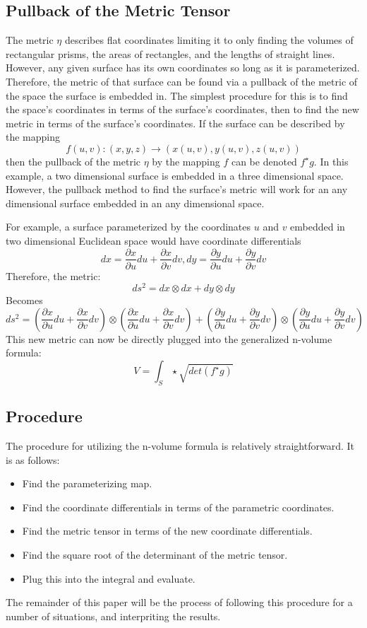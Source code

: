\documentclass{article}
\begin{document}
\subsection{Pullback of the Metric Tensor}
The metric $\eta$ describes flat coordinates limiting it to only finding the volumes of rectangular prisms, the areas of rectangles, and the lengths of straight lines. However, any given surface has its own coordinates so long as it is parameterized. Therefore, the metric of that surface can be found via a pullback of the metric of the space the surface is embedded in. The simplest procedure for this is to find the space's coordinates in terms of the surface's coordinates, then to find the new metric in terms of the surface's coordinates. If the surface can be described by the mapping
\[
f(u,v): (x,y,z) \rightarrow (x(u,v), y(u,v), z(u,v))
\]
then the pullback of the metric $\eta$ by the mapping $f$ can be denoted $f^{\star}g$. In this example, a two dimensional surface is embedded in a three dimensional space. However, the pullback method to find the surface's metric will work for an any dimensional surface embedded in an any dimensional space.

For example, a surface parameterized by the coordinates $u$ and $v$ embedded in two dimensional Euclidean space would have coordinate differentials
\[
dx = \frac{\partial x}{\partial u}du + \frac{\partial x}{\partial v} dv, dy = \frac{\partial y}{\partial u}du + \frac{\partial y}{\partial v} dv
\]
Therefore, the metric:
\[
ds^2 = dx \otimes dx + dy \otimes dy
\]
Becomes
\[
ds^2 = (\frac{\partial x}{\partial u}du + \frac{\partial x}{\partial v} dv) \otimes (\frac{\partial x}{\partial u}du + \frac{\partial x}{\partial v} dv) + (\frac{\partial y}{\partial u}du + \frac{\partial y}{\partial v} dv) \otimes (\frac{\partial y}{\partial u}du + \frac{\partial y}{\partial v} dv)
\]
This new metric can now be directly plugged into the generalized n-volume formula:
\[
V = \int_S \star \sqrt{det(f^{\star}g)}
\]
\subsection{Procedure}
The procedure for utilizing the n-volume formula is relatively straightforward. It is as follows:
\begin{itemize}
    \item Find the parameterizing map.
    \item Find the coordinate differentials in terms of the parametric coordinates.
    \item Find the metric tensor in terms of the new coordinate differentials.
    \item Find the square root of the determinant of the metric tensor.
    \item Plug this into the integral and evaluate.
\end{itemize}
The remainder of this paper will be the process of following this procedure for a number of situations, and interpriting the results.
\end{document}
